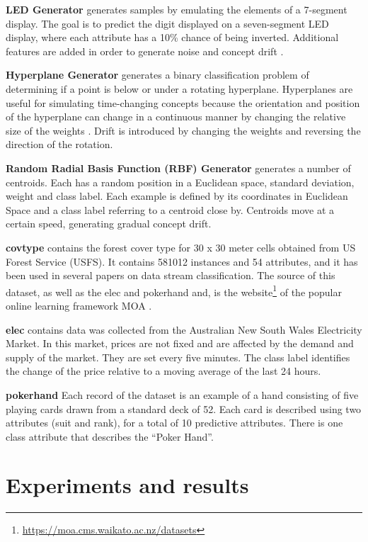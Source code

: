 \documentclass{sig-alternate-br}
\begin{document}
\textbf{LED Generator} generates samples by emulating the elements of a 7-segment display. The goal is to predict the digit displayed on a seven-segment LED display, where each attribute has a 10\% chance of being inverted. Additional features are added in order to generate noise and concept drift \cite{breiman1984classification}.

\textbf{Hyperplane Generator} generates a binary classification problem of determining if a point is below or under a rotating hyperplane. Hyperplanes are useful for simulating time-changing concepts because the orientation and position of the hyperplane can change in a continuous manner by changing the relative size of the weights \cite{hulten2001mining}. Drift is introduced by changing the weights and reversing the direction of the rotation.
    
\textbf{Random Radial Basis Function (RBF) Generator} generates a number of centroids. Each has a random position in a Euclidean space, standard deviation, weight and class label. Each example is defined by its coordinates in Euclidean Space and a class label referring to a centroid close by.  Centroids move at a certain speed, generating gradual concept drift. \cite{van2016massively}

\textbf{covtype} contains the forest cover type for 30 x 30 meter cells obtained from US Forest Service (USFS). It contains 581012 instances and 54 attributes, and it has been used in several papers on data stream classification. The source of this dataset, as well as the elec and pokerhand and, is the website\footnote{\url{https://moa.cms.waikato.ac.nz/datasets}} of the popular online learning framework MOA \cite{bifet2010moa}.

\textbf{elec} contains data was collected from the Australian New South Wales Electricity Market. In this market, prices are not fixed and are affected by the demand and supply of the market. They are set every five minutes. The class label identifies the change of the price relative to a moving average of the last 24 hours.

\textbf{pokerhand} Each record of the dataset is an example of a hand consisting of five playing cards drawn from a standard deck of 52. Each card is described using two attributes (suit and rank), for a total of 10 predictive attributes. There is one class attribute that describes the “Poker Hand”.

\section{Experiments and results}
\label{experiments}
\end{document}
